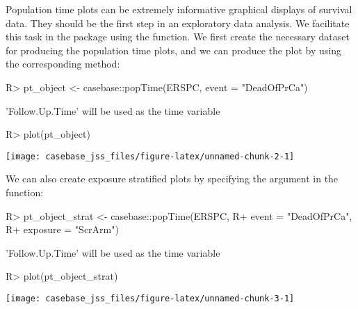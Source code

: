 \documentclass[article]{jss}
\begin{document}
Population time plots can be extremely informative graphical displays of
survival data. They should be the first step in an exploratory data
analysis. We facilitate this task in the  package using
the  function. We first create the necessary dataset for
producing the population time plots, and we can produce the plot by
using the corresponding  method:

\begin{CodeChunk}

\begin{CodeInput}
R> pt_object <- casebase::popTime(ERSPC, event = "DeadOfPrCa")
\end{CodeInput}

\begin{CodeOutput}
'Follow.Up.Time' will be used as the time variable
\end{CodeOutput}

\begin{CodeInput}
R> plot(pt_object)
\end{CodeInput}


\begin{center}\texttt{[image: casebase\_jss\_files/figure-latex/unnamed-chunk-2-1]} \end{center}

\end{CodeChunk}

We can also create exposure stratified plots by specifying the
 argument in the  function:

\begin{CodeChunk}

\begin{CodeInput}
R> pt_object_strat <- casebase::popTime(ERSPC, 
R+                                      event = "DeadOfPrCa", 
R+                                      exposure = "ScrArm")
\end{CodeInput}

\begin{CodeOutput}
'Follow.Up.Time' will be used as the time variable
\end{CodeOutput}

\begin{CodeInput}
R> plot(pt_object_strat)
\end{CodeInput}


\begin{center}\texttt{[image: casebase\_jss\_files/figure-latex/unnamed-chunk-3-1]} \end{center}

\end{CodeChunk}
\end{document}
